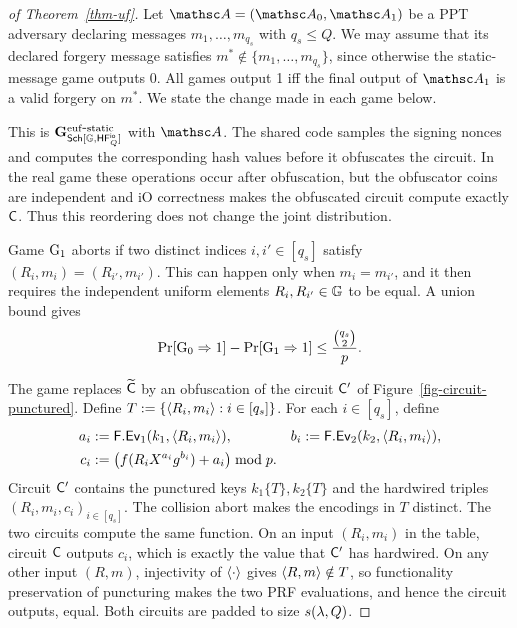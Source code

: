 \FloatBarrier

\begin{proof}[of Theorem~\ref{thm-uf}]
Let $\advA = (\advA_0, \advA_1)$ be a PPT adversary declaring messages $m_1, \ldots, m_{q_s}$ with $q_s \le Q$. We may assume that its declared forgery message satisfies $m^* \notin \{m_1,\ldots,m_{q_s}\}$, since otherwise the static-message game outputs 0. All games output 1 iff the final output of $\advA_1$ is a valid forgery on $m^*$. We state the change made in each game below.

 This is $\mathbf{G}^{\mathrm{euf\mbox{-}static}}_{\mathsf{Sch}[\mathbb{G}, \mathsf{HF}^{\mathsf{io}}_Q]}$ with $\advA$. The shared code samples the signing nonces and computes the corresponding hash values before it obfuscates the circuit. In the real game these operations occur after obfuscation, but the obfuscator coins are independent and iO correctness makes the obfuscated circuit compute exactly $\mathsf{C}$. Thus this reordering does not change the joint distribution.

 Game $\textnormal{G}_1$ aborts if two distinct indices $i,i'\in[q_s]$ satisfy $(R_i,m_i)=(R_{i'},m_{i'})$. This can happen only when $m_i=m_{i'}$, and it then requires the independent uniform elements $R_i,R_{i'}\in\mathbb{G}$ to be equal. A union bound gives
$$
\Pr[\textnormal{G}_0\Rightarrow1]-\Pr[\textnormal{G}_1\Rightarrow1]
\le \frac{\binom{q_s}{2}}{p}.
$$

 The game replaces $\widetilde{\mathsf{C}}$ by an obfuscation of the circuit $\mathsf{C}'$ of Figure~\ref{fig-circuit-punctured}. Define $T := \{\langle R_i,m_i \rangle : i \in [q_s]\}$. For each $i\in[q_s]$, define
$$
\begin{aligned}
a_i&:=\mathsf{F}.\mathsf{Ev}_1(k_1,\langle R_i,m_i \rangle),&
b_i&:=\mathsf{F}.\mathsf{Ev}_2(k_2,\langle R_i,m_i \rangle),\\
c_i&:=\big(f(R_iX^{a_i}g^{b_i})+a_i\big)\bmod p.
\end{aligned}
$$
Circuit $\mathsf{C}'$ contains the punctured keys $k_1\{T\},k_2\{T\}$ and the hardwired triples $(R_i,m_i,c_i)_{i\in[q_s]}$. The collision abort makes the encodings in $T$ distinct. The two circuits compute the same function. On an input $(R_i,m_i)$ in the table, circuit $\mathsf{C}$ outputs $c_i$, which is exactly the value that $\mathsf{C}'$ has hardwired. On any other input $(R,m)$, injectivity of $\langle \cdot \rangle$ gives $\langle R,m \rangle\notin T$, so functionality preservation of puncturing makes the two PRF evaluations, and hence the circuit outputs, equal. Both circuits are padded to size $s(\lambda,Q)$.


\end{proof}
